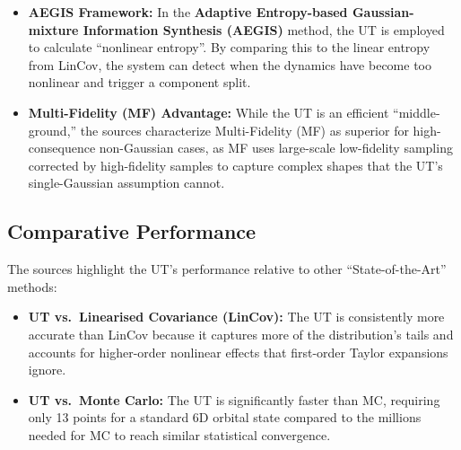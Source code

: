 \documentclass[
  letterpaper,
  DIV=11,
  numbers=noendperiod,
  oneside]{scrartcl}
\begin{document}
\begin{itemize}
\begin{itemize}
    \begin{itemize}
    \item
      \textbf{Sigma Point Propagation:} For each of the \(N_g\)
      components, a set of \(2n+1\) deterministic sigma points is
      generated using the component's mean \(\mathbf{x}_i\) and
      covariance \(\mathbf{P}_i\).
    \item
      \textbf{Independent Nonlinear Mapping:} These sigma points are
      passed through the high-fidelity nonlinear dynamics
      \(\mathbf{f}(\cdot)\).
    \item
      \textbf{Moment Reconstruction:} The transformed mean and
      covariance for \emph{each} kernel are reconstructed using standard
      UT weighting rules, preserving second-order accuracy.
    \item
      \textbf{Re-Synthesis:} The final non-Gaussian PDF is the
      re-weighted sum of these nonlinearly propagated Gaussian kernels
      with their corresponding weights \(\alpha_i\).
    \end{itemize}
  \end{itemize}
\item
  \textbf{AEGIS Framework:} In the \textbf{Adaptive Entropy-based
  Gaussian-mixture Information Synthesis (AEGIS)} method, the UT is
  employed to calculate ``nonlinear entropy''. By comparing this to the
  linear entropy from LinCov, the system can detect when the dynamics
  have become too nonlinear and trigger a component split.
\item
  \textbf{Multi-Fidelity (MF) Advantage:} While the UT is an efficient
  ``middle-ground,'' the sources characterize Multi-Fidelity (MF) as
  superior for high-consequence non-Gaussian cases, as MF uses
  large-scale low-fidelity sampling corrected by high-fidelity samples
  to capture complex shapes that the UT's single-Gaussian assumption
  cannot.
\end{itemize}

\subsection{Comparative Performance}\label{sec-ut-performance}

The sources highlight the UT's performance relative to other
``State-of-the-Art'' methods:

\begin{itemize}
\item
  \textbf{UT vs.~Linearised Covariance (LinCov):} The UT is consistently
  more accurate than LinCov because it captures more of the
  distribution's tails and accounts for higher-order nonlinear effects
  that first-order Taylor expansions ignore.
\item
  \textbf{UT vs.~Monte Carlo:} The UT is significantly faster than MC,
  requiring only 13 points for a standard 6D orbital state compared to
  the millions needed for MC to reach similar statistical convergence.
\end{itemize}
\end{document}
